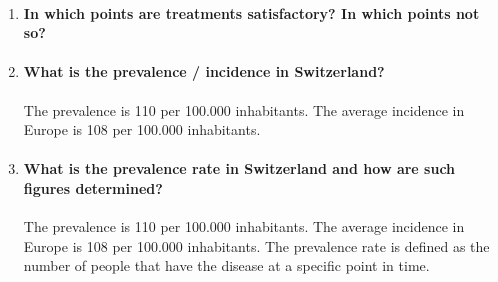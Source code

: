 \documentclass[12pt,article,oneside,a4paper]{memoir}
\begin{document}
\begin{enumerate}
\item \paragraph{In which points are treatments satisfactory?  In which points not so?}

\item \paragraph{What is the prevalence / incidence in Switzerland?}
The prevalence is 110 per 100.000 inhabitants. The average incidence in Europe
is 108 per 100.000 inhabitants.

\item \paragraph{What is the prevalence rate in Switzerland and how are such figures determined?}
The prevalence is 110 per 100.000 inhabitants. The average incidence in Europe
is 108 per 100.000 inhabitants. The prevalence rate is defined as the number of people that have the disease at a specific point in time.


\end{enumerate}
\end{document}
